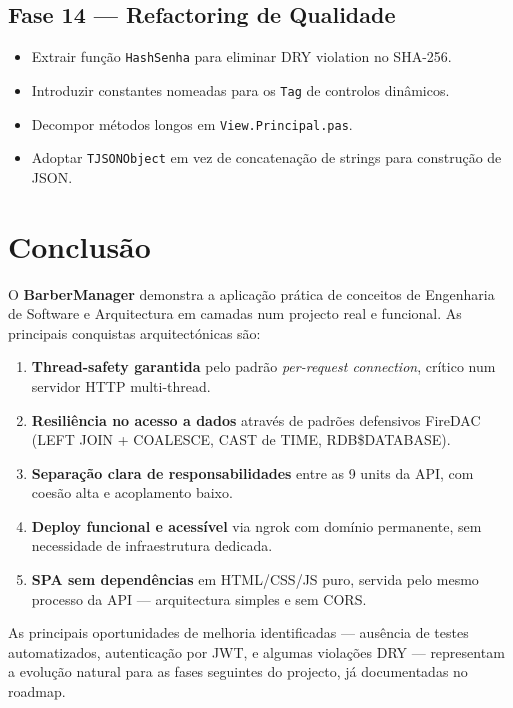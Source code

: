 \documentclass[12pt,a4paper]{article}
\begin{document}
\subsection{Fase 14 — Refactoring de Qualidade}

\begin{itemize}
  \item Extrair função \texttt{HashSenha} para eliminar DRY violation no SHA-256.
  \item Introduzir constantes nomeadas para os \texttt{Tag} de controlos dinâmicos.
  \item Decompor métodos longos em \texttt{View.Principal.pas}.
  \item Adoptar \texttt{TJSONObject} em vez de concatenação de strings para construção de JSON.
\end{itemize}

\newpage
\section{Conclusão}

O \textbf{BarberManager} demonstra a aplicação prática de conceitos de Engenharia de Software e Arquitectura em camadas num projecto real e funcional. As principais conquistas arquitectónicas são:

\begin{enumerate}
  \item \textbf{Thread-safety garantida} pelo padrão \textit{per-request connection}, crítico num servidor HTTP multi-thread.
  \item \textbf{Resiliência no acesso a dados} através de padrões defensivos FireDAC (LEFT JOIN + COALESCE, CAST de TIME, RDB\$DATABASE).
  \item \textbf{Separação clara de responsabilidades} entre as 9 units da API, com coesão alta e acoplamento baixo.
  \item \textbf{Deploy funcional e acessível} via ngrok com domínio permanente, sem necessidade de infraestrutura dedicada.
  \item \textbf{SPA sem dependências} em HTML/CSS/JS puro, servida pelo mesmo processo da API — arquitectura simples e sem CORS.
\end{enumerate}

As principais oportunidades de melhoria identificadas — ausência de testes automatizados, autenticação por JWT, e algumas violações DRY — representam a evolução natural para as fases seguintes do projecto, já documentadas no roadmap.
\end{document}
